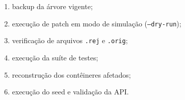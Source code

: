 \begin{enumerate}[leftmargin=*,itemsep=0.25em]
\item backup da árvore vigente;
\item execução de patch em modo de simulação (\texttt{--dry-run});
\item verificação de arquivos \texttt{.rej} e \texttt{.orig};
\item execução da suíte de testes;
\item reconstrução dos contêineres afetados;
\item execução do seed e validação da API.
\end{enumerate}
